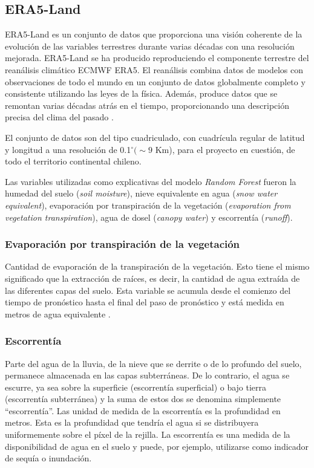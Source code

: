     \subsection{ERA5-Land}
    ERA5-Land es un conjunto de datos que proporciona una visión coherente de la evolución de las variables terrestres durante varias décadas 
    con una resolución mejorada. ERA5-Land se ha producido reproduciendo el componente terrestre del reanálisis climático ECMWF ERA5. El reanálisis combina 
    datos de modelos con observaciones de todo el mundo en un conjunto de datos globalmente completo y consistente utilizando las leyes de la física. 
    Además, produce datos que se remontan varias décadas atrás en el tiempo, proporcionando una descripción precisa del clima del pasado \cite{ERA5-L}.

    El conjunto de datos son del tipo cuadriculado, con cuadrícula regular de latitud y longitud a una resolución de 0.1$^{\circ} (\sim 9$ Km), 
    para el proyecto en cuestión, de todo el territorio continental chileno.

    Las variables utilizadas como explicativas del modelo \textit{Random Forest} fueron la humedad del suelo (\textit{soil moisture}), nieve equivalente en agua (\textit{snow water equivalent}),
    evaporación por transpiración de la vegetación (\textit{evaporation from vegetation transpiration}), agua de dosel (\textit{canopy water}) y escorrentía (\textit{runoff}).
    
    \subsubsection{Evaporación por transpiración de la vegetación}
    Cantidad de evaporación de la transpiración de la vegetación. Esto tiene el mismo significado que la extracción de raíces, 
    es decir, la cantidad de agua extraída de las diferentes capas del suelo. 
    Esta variable se acumula desde el comienzo del tiempo de pronóstico hasta el final del paso de pronóstico y está medida en metros de agua equivalente \cite{ERA5-L}.

    \subsubsection{Escorrentía}
    Parte del agua de la lluvia, de la nieve que se derrite o de lo profundo del suelo, permanece almacenada en las capas subterráneas. De lo contrario, el agua se escurre, ya sea sobre la superficie (escorrentía superficial)
    o bajo tierra (escorrentía subterránea) y la suma de estos dos se denomina simplemente ``escorrentía''. Las unidad de medida de la escorrentía es la profundidad en metros. Esta es la profundidad que tendría el agua si se distribuyera uniformemente sobre el píxel de la rejilla.
    La escorrentía es una medida de la disponibilidad de agua en el suelo y puede, por ejemplo, utilizarse como indicador de sequía o inundación.

